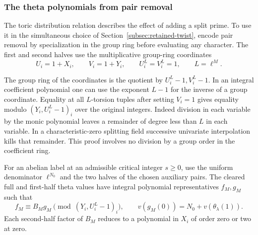 \subsubsection*{The theta polynomials from pair removal}
\hypertarget{source-twist-euler}{}

The toric distribution relation describes the effect of adding a split prime. To use it in the simultaneous choice of Section~\ref{subsec:retained-twist}, encode pair removal by specialization in the group ring before evaluating any character.
The first and second halves use the multiplicative group-ring coordinates
\[
 U_i=1+X_i,\qquad V_i=1+Y_i,\qquad U_i^L=V_i^L=1,\qquad L=\ell^M.
\]

The group ring of the coordinates is the quotient by
\(U_i^L-1,V_i^L-1\). In an integral coefficient polynomial one
can use the exponent \(L-1\) for the inverse of a group
coordinate. Equality at all \(L\)-torsion tuples after setting
\(V_i=1\) gives equality modulo \((Y_i,U_i^L-1)_i\) over the
original integers. Indeed division in each variable by the
monic polynomial leaves a remainder of degree less than \(L\)
in each variable. In a characteristic-zero splitting field
successive univariate interpolation kills that remainder.
This proof involves no division by a group order in the
coefficient ring.

\begin{lemma}\label{lem:abelian-pair-removal}
For an abelian label at an admissible critical integer \(s\ge0\),
use the uniform denominator \(\ell^{N_0}\) and the two halves of the
chosen auxiliary pairs. The cleared full and first-half theta values
have integral polynomial representatives \(f_M,g_M\) such that
\[
 f_M\equiv B_Mg_M\pmod{(Y_i,U_i^L-1)_i},\qquad
 v(g_M(0))=N_0+v(\theta_\lambda(1)).
\]
Each second-half factor of \(B_M\) reduces to a polynomial in
\(X_i\) of order zero or two at zero.
\end{lemma}


